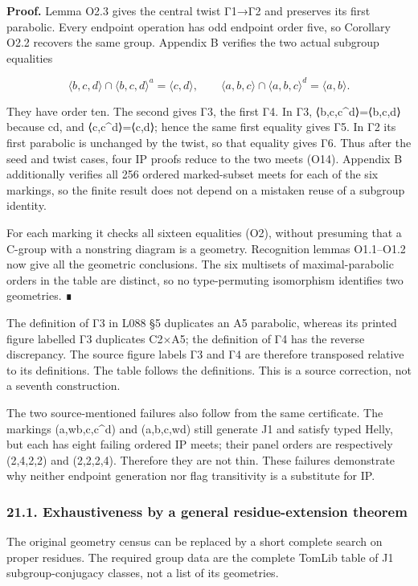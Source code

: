 \documentclass[
  10pt,
  letterpaper,
]{article}
\begin{document}
\textbf{Proof.} Lemma O2.3 gives the central twist Γ1→Γ2 and preserves
its first parabolic. Every endpoint operation has odd endpoint order
five, so Corollary O2.2 recovers the same group. Appendix B verifies the
two actual subgroup equalities

\[
\langle b,c,d\rangle\cap\langle b,c,d\rangle^a=\langle c,d\rangle,
\qquad
\langle a,b,c\rangle\cap\langle a,b,c\rangle^d=\langle a,b\rangle.
\tag{O14}
\]

They have order ten. The second gives Γ3, the first Γ4. In Γ3,
⟨b,c,c\^{}d⟩=⟨b,c,d⟩ because \textbar cd, and
⟨c,c\^{}d⟩=⟨c,d⟩; hence the same first equality gives Γ5. In Γ2 its
first parabolic is unchanged by the twist, so that equality gives Γ6.
Thus after the seed and twist cases, four IP proofs reduce to the two
meets (O14). Appendix B additionally verifies all 256 ordered
marked-subset meets for each of the six markings, so the finite result
does not depend on a mistaken reuse of a subgroup identity.

For each marking it checks all sixteen equalities (O2), without
presuming that a C-group with a nonstring diagram is a geometry.
Recognition lemmas O1.1--O1.2 now give all the geometric conclusions.
The six multisets of maximal-parabolic orders in the table are distinct,
so no type-permuting isomorphism identifies two geometries. ∎

The definition of Γ3 in L088 §5 duplicates an A5 parabolic, whereas its
printed figure labelled Γ3 duplicates C2×A5; the definition of Γ4 has
the reverse discrepancy. The source figure labels Γ3 and Γ4 are
therefore transposed relative to its definitions. The table follows the
definitions. This is a source correction, not a seventh construction.

The two source-mentioned failures also follow from the same certificate.
The markings (a,wb,c,c\^{}d) and (a,b,c,wd) still generate J1 and
satisfy typed Helly, but each has eight failing ordered IP meets; their
panel orders are respectively (2,4,2,2) and (2,2,2,4). Therefore they
are not thin. These failures demonstrate why neither endpoint generation
nor flag transitivity is a substitute for IP.

\subsubsection{21.1. Exhaustiveness by a general residue-extension
theorem}\label{exhaustiveness-by-a-general-residue-extension-theorem}

The original geometry census can be replaced by a short complete search
on proper residues. The required group data are the complete TomLib
table of J1 subgroup-conjugacy classes, not a list of its geometries.
\end{document}
